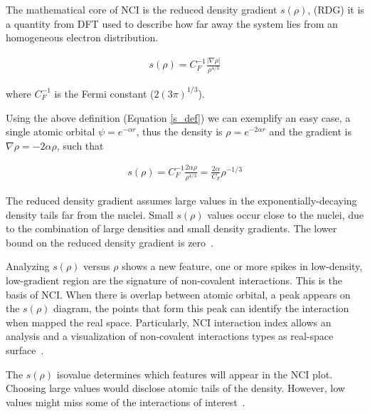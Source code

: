 The mathematical core of
NCI is the reduced density gradient $s(\rho)$,
(\gls{RDG}) it is a quantity from DFT used to describe how far away the system
lies from an homogeneous electron distribution.

\begin{align}
s(\rho) = C_F^{-1} \frac{|\nabla\rho|}{\rho^{4/3}}
\label{s_def}
\end{align}

\noindent where $C_F^{-1}$ is the Fermi constant ($2(3\pi)^{1/3}$).

Using the above definition (Equation \ref{s_def}) we can exemplify an easy
case, a single atomic orbital $\psi = e^{-\alpha r}$, thus the density is $\rho =
e^{-2\alpha r}$ and the gradient is $\nabla\rho = -2\alpha\rho$, such that

\begin{align}
s(\rho) = C_F^{-1}\frac{2\alpha\rho}{\rho^{4/3}} = \frac{2\alpha}{C_F}\rho^{-1/3}
\end{align}

The reduced density gradient assumes large values in the exponentially-decaying
density tails far from the nuclei. Small $s(\rho)$ values occur close to
the nuclei, due to the combination of large densities and small density
gradients.  The lower bound on the reduced density gradient is
zero~\cite{Narth2016}.

Analyzing $s(\rho)$ versus $\rho$ shows a new feature, one or more spikes in
low-density, low-gradient region are the signature of non-covalent interactions.
This is the basis of NCI. When there is overlap between atomic orbital, a peak
appears on the $s(\rho)$ diagram, the points that form this peak can identify
the interaction when mapped the real space. Particularly, NCI interaction
index allows an analysis and a visualization of non-covalent interactions types as
real-space surface~\cite{Narth2016}.

The $s(\rho)$ isovalue determines which
features will appear in the NCI plot. Choosing large values would disclose
atomic tails of the density. However, low values might miss some of the
interactions of interest~\cite{Lane2013}.


